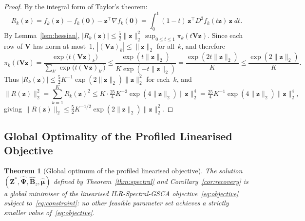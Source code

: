 \documentclass{article}
\newtheorem{theorem}{Theorem}
\begin{document}
\begin{proof}
By the integral form of Taylor's theorem:
\[
  R_k(\mathbf{z})
  = f_k(\mathbf{z}) - f_k(\mathbf{0})
    - \mathbf{z}^{\!\top}\nabla f_k(\mathbf{0})
  = \int_0^1 (1-t)\,
    \mathbf{z}^{\!\top}D^2\!f_k(t\mathbf{z})\,\mathbf{z}\;dt.
\]
By Lemma~\ref{lem:hessian},
$|R_k(\mathbf{z})| \leq \tfrac{5}{2}\|\mathbf{z}\|_2^2\,
 \sup_{0\leq t\leq 1}\pi_k(t\mathbf{V}\mathbf{z})$.
Since each row of $\mathbf{V}$ has norm at most~1,
$|(\mathbf{V}\mathbf{z})_k|\leq\|\mathbf{z}\|_2$ for all~$k$, and
therefore
\[
  \pi_k(t\mathbf{V}\mathbf{z})
  = \frac{\exp\bigl(t(\mathbf{V}\mathbf{z})_k\bigr)}
         {\sum_{k'}\exp\bigl(t(\mathbf{V}\mathbf{z})_{k'}\bigr)}
  \leq \frac{\exp(t\|\mathbf{z}\|_2)}
            {K\exp(-t\|\mathbf{z}\|_2)}
  = \frac{\exp(2t\|\mathbf{z}\|_2)}{K}
  \leq \frac{\exp(2\|\mathbf{z}\|_2)}{K}.
\]
Thus $|R_k(\mathbf{z})|
 \leq \tfrac{5}{2}K^{-1}\exp(2\|\mathbf{z}\|_2)\|\mathbf{z}\|_2^2$
for each~$k$, and
\[
  \|R(\mathbf{z})\|_2^2
  = \sum_{k=1}^K R_k(\mathbf{z})^2
  \leq K \cdot \tfrac{25}{4}K^{-2}
       \exp(4\|\mathbf{z}\|_2)\|\mathbf{z}\|_2^4
  = \tfrac{25}{4}K^{-1}
    \exp(4\|\mathbf{z}\|_2)\|\mathbf{z}\|_2^4,
\]
giving $\|R(\mathbf{z})\|_2
 \leq \tfrac{5}{2}K^{-1/2}
      \exp(2\|\mathbf{z}\|_2)\|\mathbf{z}\|_2^2$.
\end{proof}


\subsection{Global Optimality of the Profiled Linearised Objective}
\label{subsec:global_optimality}

\begin{theorem}[Global optimum of the profiled linearised objective]
\label{thm:global}
The solution
$(\mathbf{Z}^*,\hat{\boldsymbol{\Psi}},
  \hat{\mathbf{B}}_z,\hat{\boldsymbol{\mu}})$
defined by Theorem~\ref{thm:spectral} and
Corollary~\ref{cor:recovery} is a \emph{global} minimiser
of the linearised ILR-Spectral-GSCA
objective~\eqref{eq:objective} subject
to~\eqref{eq:constraint}: no other feasible parameter set achieves a
strictly smaller value of~\eqref{eq:objective}.
\end{theorem}
\end{document}

